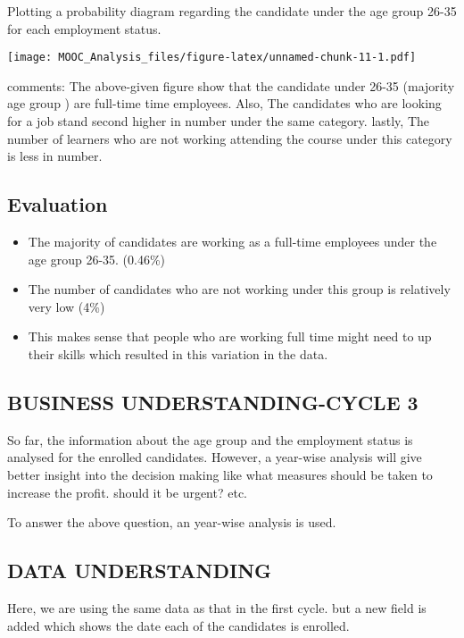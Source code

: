 \documentclass[
]{article}
\begin{document}
Plotting a probability diagram regarding the candidate under the age
group 26-35 for each employment status.

\texttt{[image: MOOC\_Analysis\_files/figure-latex/unnamed-chunk-11-1.pdf]}

comments: The above-given figure show that the candidate under 26-35
(majority age group ) are full-time time employees. Also, The candidates
who are looking for a job stand second higher in number under the same
category. lastly, The number of learners who are not working attending
the course under this category is less in number.

\hypertarget{evaluation-2}{%
\subsection{Evaluation}\label{evaluation-2}}

\begin{itemize}
\item
  The majority of candidates are working as a full-time employees under
  the age group 26-35. (0.46\%)
\item
  The number of candidates who are not working under this group is
  relatively very low (4\%)
\item
  This makes sense that people who are working full time might need to
  up their skills which resulted in this variation in the data.
\end{itemize}

\hypertarget{business-understanding-cycle-3}{%
\subsection{BUSINESS UNDERSTANDING-CYCLE
3}\label{business-understanding-cycle-3}}

So far, the information about the age group and the employment status is
analysed for the enrolled candidates. However, a year-wise analysis will
give better insight into the decision making like what measures should
be taken to increase the profit. should it be urgent? etc.

To answer the above question, an year-wise analysis is used.

\hypertarget{data-understanding-3}{%
\subsection{DATA UNDERSTANDING}\label{data-understanding-3}}

Here, we are using the same data as that in the first cycle. but a new
field is added which shows the date each of the candidates is enrolled.
\end{document}

